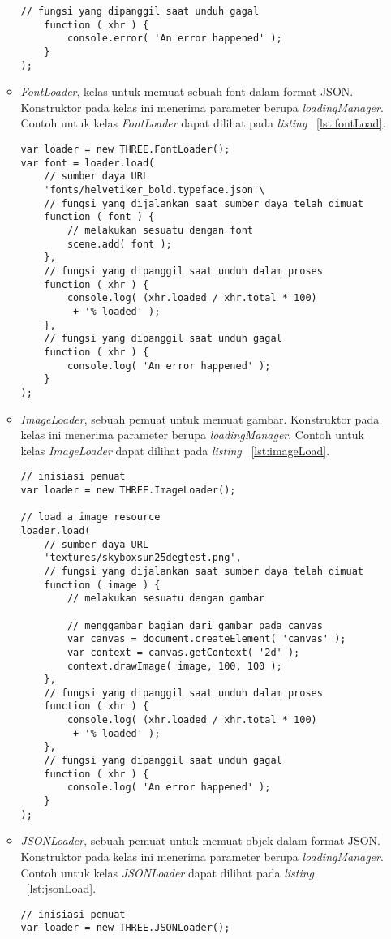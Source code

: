 \begin{itemize}
\begin{itemize}
\begin{lstlisting}[caption={Contoh penggunaan kelas {\it FileLoader}.}, label={lst:fileLoad},captionpos=b]
    // fungsi yang dipanggil saat unduh gagal
    function ( xhr ) {
        console.error( 'An error happened' );
    }
);
\end{lstlisting}
		\item {\it FontLoader}, kelas untuk memuat sebuah font dalam format JSON. Konstruktor pada kelas ini menerima parameter berupa  {\it loadingManager}. Contoh untuk kelas {\it FontLoader} dapat dilihat pada {\it listing} ~\ref{lst:fontLoad}.
\begin{lstlisting}[caption={Contoh penggunaan kelas {\it FontLoader}.}, label={lst:fontLoad},captionpos=b]
var loader = new THREE.FontLoader();
var font = loader.load(
	// sumber daya URL
	'fonts/helvetiker_bold.typeface.json'\
	// fungsi yang dijalankan saat sumber daya telah dimuat
	function ( font ) {
		// melakukan sesuatu dengan font
		scene.add( font );
	},
	// fungsi yang dipanggil saat unduh dalam proses
	function ( xhr ) {
		console.log( (xhr.loaded / xhr.total * 100)
		 + '% loaded' );
	},
	// fungsi yang dipanggil saat unduh gagal
	function ( xhr ) {
		console.log( 'An error happened' );
	}
);
\end{lstlisting}
		\item {\it ImageLoader}, sebuah pemuat untuk memuat gambar. Konstruktor pada kelas ini menerima parameter berupa  {\it loadingManager}. Contoh untuk kelas {\it ImageLoader} dapat dilihat pada {\it listing} ~\ref{lst:imageLoad}.
\begin{lstlisting}[caption={Contoh penggunaan kelas {\it ImageLoader}.}, label={lst:imageLoad},captionpos=b]
// inisiasi pemuat
var loader = new THREE.ImageLoader();

// load a image resource
loader.load(
	// sumber daya URL
	'textures/skyboxsun25degtest.png',
	// fungsi yang dijalankan saat sumber daya telah dimuat
	function ( image ) {
		// melakukan sesuatu dengan gambar

		// menggambar bagian dari gambar pada canvas
		var canvas = document.createElement( 'canvas' );
		var context = canvas.getContext( '2d' );
		context.drawImage( image, 100, 100 );
	},
	// fungsi yang dipanggil saat unduh dalam proses
	function ( xhr ) {
		console.log( (xhr.loaded / xhr.total * 100)
		 + '% loaded' );
	},
	// fungsi yang dipanggil saat unduh gagal
	function ( xhr ) {
		console.log( 'An error happened' );
	}
);
\end{lstlisting}
		\item {\it JSONLoader}, sebuah pemuat untuk memuat objek dalam format JSON. Konstruktor pada kelas ini menerima parameter berupa  {\it loadingManager}. Contoh untuk kelas {\it JSONLoader} dapat dilihat pada {\it listing} ~\ref{lst:jsonLoad}.
\begin{lstlisting}[caption={Contoh penggunaan kelas {\it JSONLoader}.}, label={lst:jsonLoad},captionpos=b]
// inisiasi pemuat
var loader = new THREE.JSONLoader();


\end{lstlisting}
\end{itemize}
\end{itemize}
